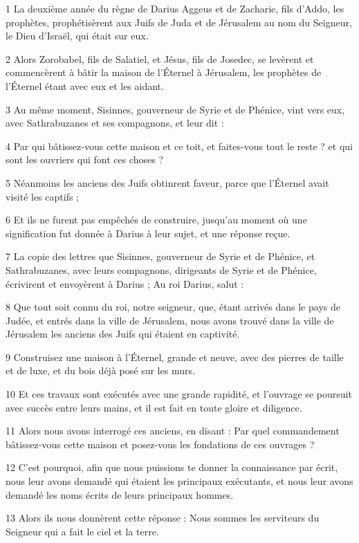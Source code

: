 \par 1 La deuxième année du règne de Darius Aggeus et de Zacharie, fils d'Addo, les prophètes, prophétisèrent aux Juifs de Juda et de Jérusalem au nom du Seigneur, le Dieu d'Israël, qui était sur eux.
\par 2 Alors Zorobabel, fils de Salatiel, et Jésus, fils de Josedec, se levèrent et commencèrent à bâtir la maison de l'Éternel à Jérusalem, les prophètes de l'Éternel étant avec eux et les aidant.
\par 3 Au même moment, Sisinnes, gouverneur de Syrie et de Phénice, vint vers eux, avec Sathrabuzanes et ses compagnons, et leur dit :
\par 4 Par qui bâtissez-vous cette maison et ce toit, et faites-vous tout le reste ? et qui sont les ouvriers qui font ces choses ?
\par 5 Néanmoins les anciens des Juifs obtinrent faveur, parce que l'Éternel avait visité les captifs ;
\par 6 Et ils ne furent pas empêchés de construire, jusqu'au moment où une signification fut donnée à Darius à leur sujet, et une réponse reçue.
\par 7 La copie des lettres que Sisinnes, gouverneur de Syrie et de Phénice, et Sathrabuzanes, avec leurs compagnons, dirigeants de Syrie et de Phénice, écrivirent et envoyèrent à Darius ; Au roi Darius, salut :
\par 8 Que tout soit connu du roi, notre seigneur, que, étant arrivés dans le pays de Judée, et entrés dans la ville de Jérusalem, nous avons trouvé dans la ville de Jérusalem les anciens des Juifs qui étaient en captivité.
\par 9 Construisez une maison à l'Éternel, grande et neuve, avec des pierres de taille et de luxe, et du bois déjà posé sur les murs.
\par 10 Et ces travaux sont exécutés avec une grande rapidité, et l'ouvrage se poursuit avec succès entre leurs mains, et il est fait en toute gloire et diligence.
\par 11 Alors nous avons interrogé ces anciens, en disant : Par quel commandement bâtissez-vous cette maison et posez-vous les fondations de ces ouvrages ?
\par 12 C'est pourquoi, afin que nous puissions te donner la connaissance par écrit, nous leur avons demandé qui étaient les principaux exécutants, et nous leur avons demandé les noms écrits de leurs principaux hommes.
\par 13 Alors ils nous donnèrent cette réponse : Nous sommes les serviteurs du Seigneur qui a fait le ciel et la terre.

